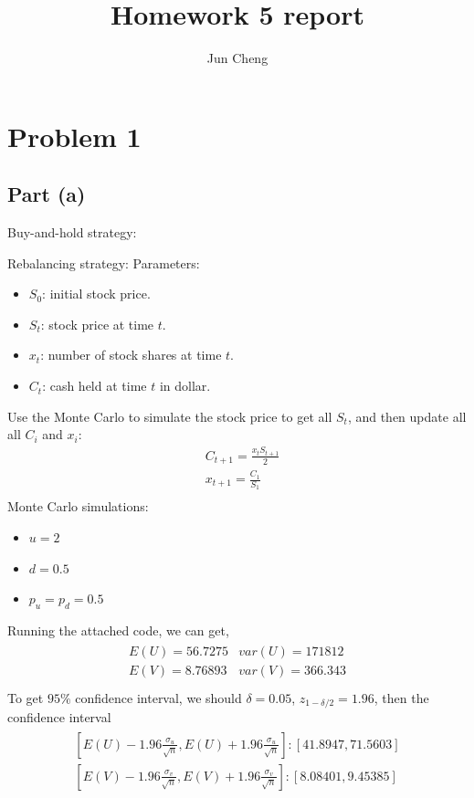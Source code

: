 \documentclass{report}
\begin{document}
\title{Homework 5 report}
\author{Jun Cheng}
\maketitle

\section*{Problem 1} 
\subsection*{Part (a)} 
Buy-and-hold strategy: 

Rebalancing strategy: 
Parameters: 
\begin{itemize}
\item $S_0$: initial stock price.
\item $S_t$: stock price at time $t$.
\item $x_t$: number of stock shares at time $t$.
\item $C_t$: cash held at time $t$ in dollar. 
\end{itemize}
Use the Monte Carlo to simulate the stock price to get all $S_t$,  and then update all all $C_i $ and $x_i$: 
\begin{align*}
&C_{t+1}=\frac{x_tS_{t+1}}{2} \\
&x_{t+1}=\frac{C_1}{S_1}\\
\end{align*}
Monte Carlo simulations: 
\begin{itemize}
\item $ u=2$
\item $ d=0.5$
\item $p_u = p_d = 0.5$
\end{itemize} 
Running the attached code, we can get, 
\begin{align*}\begin{array}{ll}
E(U)=56.7275  & var(U) =171812\\
E(V)=  8.76893 & var(V)=366.343\\
\end{array} \end{align*}
To get $95\% $ confidence interval, we should $\delta = 0.05$, $z_{1-\delta/2}=1.96$, then the confidence interval
\begin{align*}
\begin{array}{ll}
\left[E(U)-1.96\frac{\sigma_u}{\sqrt{n}}, E(U)+1.96\frac{\sigma_u}{\sqrt{n}}\right]  :   [41.8947, 71.5603]\\
\left[E(V)-1.96\frac{\sigma_v}{\sqrt{n}},  E(V)+1.96\frac{\sigma_v}{\sqrt{n}}\right]  :   [ 8.08401, 9.45385  ]\\
\end{array}
\end{align*}
\end{document}
